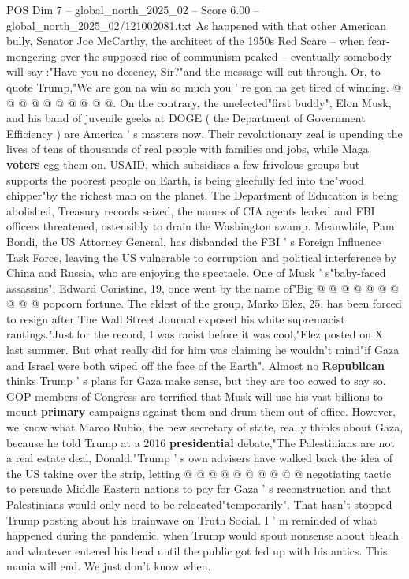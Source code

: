 \begin{textsample}{POS Dim 7 – global\_north\_2025\_02 – Score 6.00 – global\_north\_2025\_02/121002081.txt}
As happened with that other American bully, Senator Joe McCarthy, the architect of the 1950s Red Scare -- when fear-mongering over the supposed rise of communism peaked -- eventually somebody will say :"Have you no decency, Sir?"and the message will cut through.
Or, to quote Trump,"We are gon na win so much you ' re gon na get tired of winning. @ @ @ @ @ @ @ @ @ @.
On the contrary, the unelected"first buddy", Elon Musk, and his band of juvenile geeks at DOGE ( the Department of Government Efficiency ) are America ' s masters now.
Their revolutionary zeal is upending the lives of tens of thousands of real people with families and jobs, while Maga \textbf{voters} egg them on.
USAID, which subsidises a few frivolous groups but supports the poorest people on Earth, is being gleefully fed into the"wood chipper"by the richest man on the planet.
The Department of Education is being abolished, Treasury records seized, the names of CIA agents leaked and FBI officers threatened, ostensibly to drain the Washington swamp.
Meanwhile, Pam Bondi, the US Attorney General, has disbanded the FBI ' s Foreign Influence Task Force, leaving the US vulnerable to corruption and political interference by China and Russia, who are enjoying the spectacle.
One of Musk ' s"baby-faced assassins", Edward Coristine, 19, once went by the name of"Big @ @ @ @ @ @ @ @ @ @ popcorn fortune.
The eldest of the group, Marko Elez, 25, has been forced to resign after The Wall Street Journal exposed his white supremacist rantings."Just for the record, I was racist before it was cool,"Elez posted on X last summer.
But what really did for him was claiming he wouldn't mind"if Gaza and Israel were both wiped off the face of the Earth".
Almost no \textbf{Republican} thinks Trump ' s plans for Gaza make sense, but they are too cowed to say so.
GOP members of Congress are terrified that Musk will use his vast billions to mount \textbf{primary} campaigns against them and drum them out of office.
However, we know what Marco Rubio, the new secretary of state, really thinks about Gaza, because he told Trump at a 2016 \textbf{presidential} debate,"The Palestinians are not a real estate deal, Donald."Trump ' s own advisers have walked back the idea of the US taking over the strip, letting @ @ @ @ @ @ @ @ @ @ negotiating tactic to persuade Middle Eastern nations to pay for Gaza ' s reconstruction and that Palestinians would only need to be relocated"temporarily".
That hasn't stopped Trump posting about his brainwave on Truth Social.
I ' m reminded of what happened during the pandemic, when Trump would spout nonsense about bleach and whatever entered his head until the public got fed up with his antics.
This mania will end.
We just don't know when.

\end{textsample}
